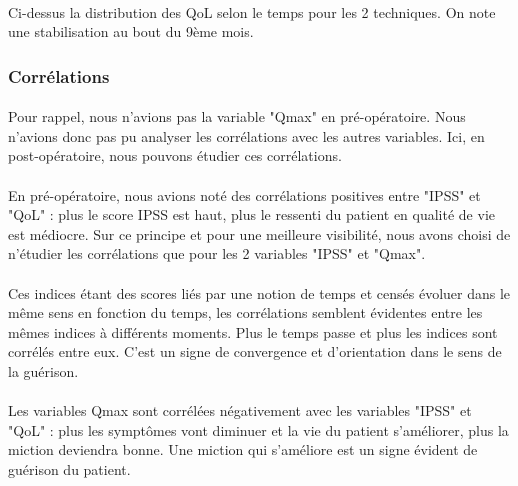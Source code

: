 \documentclass[11pt]{article}
\begin{document}
    \begin{center}
    \end{center}
    
    
\paragraph{}Ci-dessus la distribution des QoL selon le temps pour les 2 techniques.
On note une stabilisation au bout du 9ème mois.

    \subsubsection{Corrélations}\label{corruxe9lations}



    \begin{center}
    \end{center}
    
    
\paragraph{}Pour rappel, nous n'avions pas la variable "Qmax" en pré-opératoire.
Nous n'avions donc pas pu analyser les corrélations avec les autres
variables. Ici, en post-opératoire, nous pouvons étudier ces
corrélations.
\paragraph{}
En pré-opératoire, nous avions noté des corrélations positives entre
"IPSS" et "QoL" : plus le score IPSS est haut, plus le ressenti du
patient en qualité de vie est médiocre. Sur ce principe et pour une
meilleure visibilité, nous avons choisi de n'étudier les corrélations
que pour les 2 variables "IPSS" et "Qmax".
\paragraph{}
Ces indices étant des scores liés par une notion de temps et censés
évoluer dans le même sens en fonction du temps, les corrélations
semblent évidentes entre les mêmes indices à différents moments. Plus le
temps passe et plus les indices sont corrélés entre eux. C'est un signe
de convergence et d'orientation dans le sens de la guérison.
\paragraph{}
Les variables Qmax sont corrélées négativement avec les variables "IPSS"
et "QoL" : plus les symptômes vont diminuer et la vie du patient
s'améliorer, plus la miction deviendra bonne. Une miction qui s'améliore
est un signe évident de guérison du patient.
\end{document}
